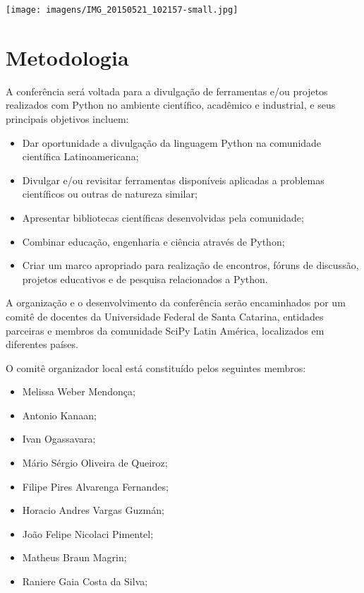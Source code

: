 \documentclass[report,a4paper,twocolumn]{memoir}
\begin{document}
\begin{center}
\texttt{[image: imagens/IMG\_20150521\_102157-small.jpg]}
\end{center}

\chapter*{Metodologia}

A conferência será voltada para a divulgação de ferramentas e/ou projetos realizados com Python no ambiente científico, acadêmico e industrial, e seus principais objetivos incluem:
\begin{itemize}
\item Dar oportunidade a divulgação da linguagem Python na comunidade científica Latinoamericana;
\item Divulgar e/ou revisitar ferramentas disponíveis aplicadas a problemas científicos ou outras de natureza similar;
\item Apresentar bibliotecas científicas desenvolvidas pela comunidade;
\item Combinar educação, engenharia e ciência através de Python;
\item Criar um marco apropriado para realização de encontros, fóruns de discussão, projetos educativos e de pesquisa relacionados a Python.
\end{itemize}

A organização e o desenvolvimento da conferência serão encaminhados por um comitê de docentes da Universidade Federal de Santa Catarina, entidades parceiras e membros da comunidade SciPy Latin América, localizados em diferentes países.

O comitê organizador local está constituído pelos seguintes membros:
\begin{itemize}
\item Melissa Weber Mendonça;
\item Antonio Kanaan;
\item Ivan Ogassavara;
\item Mário Sérgio Oliveira de Queiroz;
\item Filipe Pires Alvarenga Fernandes;
\item Horacio Andres Vargas Guzmán;
\item João Felipe Nicolaci Pimentel;
\item Matheus Braun Magrin;
\item Raniere Gaia Costa da Silva;
\end{itemize}
\end{document}
